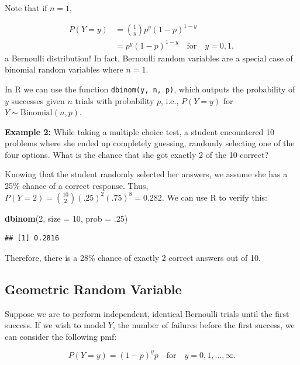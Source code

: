 \documentclass[
]{krantz}
\newenvironment{Shaded}{\begin{snugshade}}{\end{snugshade}}
\newcommand{\DataTypeTok}[1]{\textcolor[rgb]{0.27,0.27,0.27}{#1}}
\newcommand{\DecValTok}[1]{\textcolor[rgb]{0.06,0.06,0.06}{#1}}
\newcommand{\FloatTok}[1]{\textcolor[rgb]{0.06,0.06,0.06}{#1}}
\newcommand{\KeywordTok}[1]{\textcolor[rgb]{0.27,0.27,0.27}{\textbf{#1}}}
\newcommand{\NormalTok}[1]{#1}
\begin{document}
Note that if \(n=1\),

\begin{align*}
 P(Y=y) &= \binom{1}{y} p^y(1-p)^{1-y} \\
        &= p^y(1-p)^{1-y}\quad \textrm{for}\quad y = 0, 1,
\end{align*}
a Bernoulli distribution! In fact, Bernoulli random variables are a special case of binomial random variables where \(n=1\).

In R we can use the function \texttt{dbinom(y,\ n,\ p)}, which outputs the probability of \(y\) successes given \(n\) trials with probability \(p\), i.e., \(P(Y=y)\) for \(Y \sim \textrm{Binomial}(n,p)\).

\textbf{Example 2:} While taking a multiple choice test, a student encountered 10 problems where she ended up completely guessing, randomly selecting one of the four options. What is the chance that she got exactly 2 of the 10 correct?

Knowing that the student randomly selected her answers, we assume she has a 25\% chance of a correct response. Thus, \(P(Y=2) = {10 \choose 2}(.25)^2(.75)^8 = 0.282\). We can use R to verify this:

\begin{Shaded}
\begin{Highlighting}[]
\KeywordTok{dbinom}\NormalTok{(}\DecValTok{2}\NormalTok{, }\DataTypeTok{size =} \DecValTok{10}\NormalTok{, }\DataTypeTok{prob =} \FloatTok{.25}\NormalTok{)}
\end{Highlighting}
\end{Shaded}

\begin{verbatim}
## [1] 0.2816
\end{verbatim}

Therefore, there is a 28\% chance of exactly 2 correct answers out of 10.

\hypertarget{geometric-random-variable}{%
\subsection{Geometric Random Variable}\label{geometric-random-variable}}

Suppose we are to perform independent, identical Bernoulli trials until the first success. If we wish to model \(Y\), the number of failures before the first success, we can consider the following pmf:

\begin{equation}
P(Y=y) = (1-p)^yp \quad \textrm{for}\quad y = 0, 1, \ldots, \infty.
\label{eq:geomRV}
\end{equation}
\end{document}
